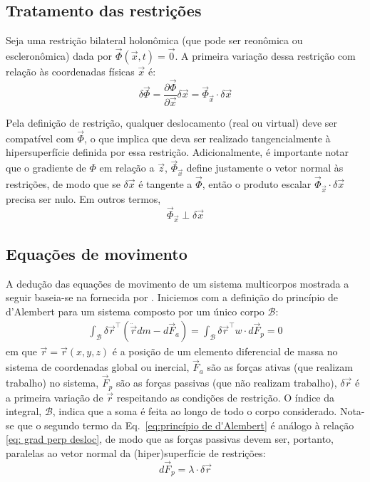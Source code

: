 \subsection{Tratamento das restrições}

Seja uma restrição bilateral holonômica (que pode ser reonômica ou escleronômica) dada por $\vec{\Phi}(\vec{x},t) = \vec{0}$. A primeira variação dessa restrição com relação às coordenadas físicas $\vec{x}$ é:
\begin{equation}
    \delta\vec{\Phi} = \frac{\partial\vec{\Phi}}{\partial\vec{x}}\delta{\vec{x}} = \vec{\Phi}_{\vec{x}} \cdot \delta\vec{x}
\end{equation}

Pela definição de restrição, qualquer deslocamento (real ou virtual) deve ser compatível com $\vec{\Phi}$, o que implica que deva ser realizado tangencialmente à hipersuperfície definida por essa restrição. Adicionalmente, é importante notar que o gradiente de $\Phi$ em relação a $\vec{z}$, $\vec{\Phi}_{\vec{x}}$ define justamente o vetor normal às restrições, de modo que se $\delta\vec{x}$ é tangente a $\vec{\Phi}$, então o produto escalar $\vec{\Phi}_{\vec{x}} \cdot \delta\vec{x}$ precisa ser nulo. Em outros termos,
\begin{equation}
    \vec{\Phi}_{\vec{x}} \perp \delta\vec{x} \label{eq: grad perp desloc}
\end{equation}

\subsection{Equações de movimento}
A dedução das equações de movimento de um sistema multicorpos mostrada a seguir baseia-se na fornecida por . Iniciemos com a definição do  princípio de d'Alembert para um sistema composto por um único corpo $\mathcal{B}$:
\begin{align}
 \int_\mathcal{B}{\delta\vec{r}^\intercal}(\ddot{\vec{r}}dm - d\vec{F}_a) = \int_\mathcal{B}{\delta\vec{r}^\intercal w\cdot d\vec{F}_p} = 0 \label{eq:princípio de d'Alembert}
\end{align}
em que $\vec{r} = \vec{r}(x,y,z)$ é a posição de um elemento diferencial de massa no sistema de coordenadas global ou inercial, $\vec{F}_a$ são as forças ativas (que realizam trabalho) no sistema, $\vec{F}_p$ são as forças passivas (que não realizam trabalho), $\delta\vec{r}$ é a primeira variação de $\vec{r}$ respeitando as condições de restrição. O índice da integral, $\mathcal{B}$, indica que a soma é feita ao longo de todo o corpo considerado. Nota-se que o segundo termo da Eq.~\eqref{eq:princípio de d'Alembert} é análogo à relação \ref{eq: grad perp desloc}, de modo que as forças passivas devem ser, portanto, paralelas ao vetor normal da (hiper)superfície de restrições:
\begin{equation}
    d\vec{F}_p = \lambda \cdot \delta\vec{r}
\end{equation}

